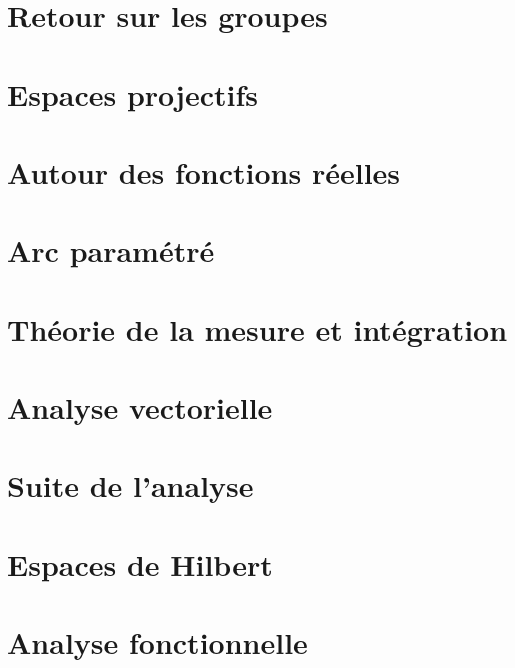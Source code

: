 \chapter{Retour sur les groupes}



\chapter{Espaces projectifs}


\chapter{Autour des fonctions réelles}






\chapter{Arc paramétré}


\chapter{Théorie de la mesure et intégration}







\chapter{Analyse vectorielle}



\chapter{Suite de l'analyse}






\chapter{Espaces de Hilbert}


\chapter{Analyse fonctionnelle}



